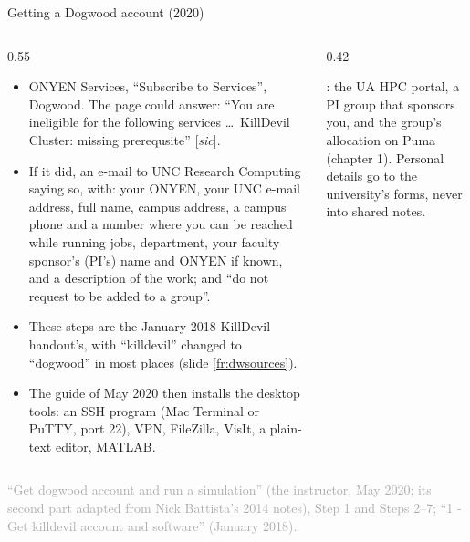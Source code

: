 \documentclass[aspectratio=169,11pt]{beamer}
\newcommand{\sourcecredit}[1]{\vfill\begin{flushright}\tiny\textcolor{DarkGray}{#1}\end{flushright}}
\begin{document}
\begin{frame}{Getting a Dogwood account (2020)}
\label{fr:dwaccount}
\begin{columns}[T,onlytextwidth]
\begin{column}{0.55\textwidth}
\scriptsize
\begin{itemize}\setlength{\itemsep}{2pt}
  \item ONYEN Services, ``Subscribe to Services'', Dogwood. The page could answer: ``You are ineligible for the following services \ldots\ KillDevil Cluster: missing  prerequsite'' [\emph{sic}].
  \item If it did, an e-mail to UNC Research Computing saying so, with: your ONYEN, your UNC e-mail address, full name, campus address, a campus phone and a number where you can be reached while running jobs, department, your faculty sponsor's (PI's) name and ONYEN if known, and a description of the work; and ``do not request to be added to a group''.
  \item These steps are the January 2018 KillDevil handout's, with ``killdevil'' changed to ``dogwood'' in most places (slide \ref{fr:dwsources}).
  \item The guide of May 2020 then installs the desktop tools: an SSH program (Mac Terminal or PuTTY, port 22), VPN, FileZilla, VisIt, a plain-text editor, MATLAB.
\end{itemize}
\end{column}
\begin{column}{0.42\textwidth}
\begin{punchbox}
\small {}: the UA HPC portal, a PI group that sponsors you, and the group's allocation on Puma (chapter 1). Personal details go to the university's forms, never into shared notes.
\end{punchbox}
\end{column}
\end{columns}
\sourcecredit{``Get dogwood account and run a simulation'' (the instructor, May 2020; its second part adapted from Nick Battista's 2014 notes), Step 1 and Steps 2--7; ``1 - Get killdevil account and software'' (January 2018).}
\end{frame}
\end{document}
